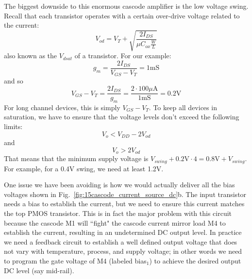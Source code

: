 The biggest downside to this enormous cascode amplifier is the low voltage swing.  Recall that each transistor operates with a certain over-drive voltage related to the current:
\begin{equation}
	V_{od} = V_T + \sqrt{\frac{2 I_{DS}}{\mu C_{ox} \frac{W}{L}}} 
\end{equation}
%
also known as the $V_{dsat}$ of a transistor.  For our example:
\begin{equation} 
	{g_m} = \frac{{2{I_{DS}}}}{{{V_{GS}} - {V_T}}} = 1\mathrm{mS} 
\end{equation}
%
and so
%
\begin{equation} 
	{V_{GS}} - {V_T} = \frac{{2{I_{DS}}}}{{{g_m}}} 
           = \frac{{2 \cdot100\mu \mathrm{A}}}{{1\mathrm{mS}}} = 0.2\mathrm{V} 
\end{equation}
%
For long channel devices, this is simply $V_{GS} - V_T$.  To keep all devices in saturation, we have to ensure that the voltage levels don't exceed the following limits:
%
\begin{equation}
	V_{o} < V_{DD} - 2 V_{od}
\end{equation} 
and
%
\begin{equation}
	V_{o} >  2 V_{od}
\end{equation} 
%
That means that the minimum supply voltage is $V_{swing} + 0.2\mathrm{V} \cdot 4 = 0.8\mathrm{V} + V_{swing}$.  For example, for a 0.4V swing, we need at least 1.2V.  

One issue we have been avoiding is how we would actually deliver all the bias voltages shown in Fig.~\ref{fig:15cascode_current_source_dc}b.  The input transistor needs a bias to establish the current, but we need to ensure this current matches the top PMOS transistor.  This is in fact the major problem with this circuit because the cascode M1 will ``fight" the cascode current mirror load M4 to establish the current, resulting in an undetermined DC output level.  In practice we need a feedback circuit to establish a well defined output voltage that does not vary with temperature, process, and supply voltage; in other words we need to program the gate voltage of M4 (labeled bias$_1$) to achieve the desired output DC level (say mid-rail).
 



\section{\topicE}



